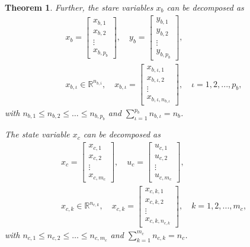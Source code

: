 \documentclass[11pt,letterpaper,twoside,openright]{report}
\newtheorem{theorem}{Theorem}[chapter]
\begin{document}
\begin{theorem}
Further, the stare variables $x_b$ can be decomposed as
\begin{eqnarray}
	x_b=
	\begin{bmatrix}
		x_{b,1} \\
		x_{b,2} \\
		\vdots \\
		x_{b,p_b}
	\end{bmatrix}, \quad
	y_b=
	\begin{bmatrix}
		y_{b,1} \\
		y_{b,2} \\
		\vdots \\
		y_{b,p_b}
	\end{bmatrix}, \\
	x_{b,\iota} \in \mathbb{R}^{n_{b,i}},\quad
	x_{b,\iota}=
	\begin{bmatrix}
		x_{b,\iota,1} \\
		x_{b,\iota,2} \\
		\vdots \\
		x_{b,\iota,n_{b,\iota}}
	\end{bmatrix}, \quad \iota=1,2,...,p_b,
\end{eqnarray}
with $n_{b,1} \leq n_{b,2} \leq \hdots \leq n_{b,p_b}$ and $\sum_{\iota=1}^{p_b} n_{b,\iota}=n_b$.

The state variable $x_c$ can be decomposed as
\begin{eqnarray}
	x_c=
	\begin{bmatrix}
		x_{c,1} \\
		x_{c,2} \\
		\vdots \\
		x_{c,m_c}
	\end{bmatrix}, \quad
	u_c=
	\begin{bmatrix}
		u_{c,1} \\
		u_{c,2} \\
		\vdots \\
		u_{c,m_c}
	\end{bmatrix}, \\
	x_{c,k} \in \mathbb{R}^{n_{c,k}},\quad
	x_{c,k}=
	\begin{bmatrix}
		x_{c,k,1} \\
		x_{c,k,2} \\
		\vdots \\
		x_{c,k,n_{c,k}}
	\end{bmatrix}, \quad k=1,2,...,m_c,
\end{eqnarray}
with $n_{c,1} \leq n_{c,2} \leq \hdots \leq n_{c,m_c}$ and $\sum_{k=1}^{m_c} n_{c,k}=n_c$. 


\end{theorem}
\end{document}
